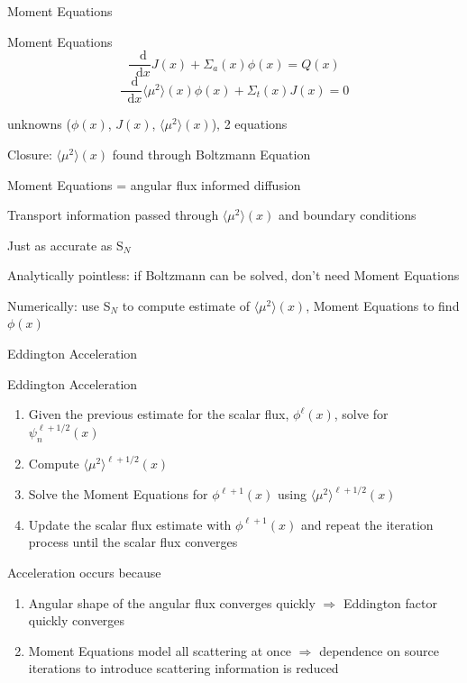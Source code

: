 \documentclass[10pt]{beamer}
\newcommand{\SN}{S$_N$\xspace}
\newcommand{\ud}{\mathop{}\!\mathrm{d}} %
\newcommand{\dderiv}[2]{\frac{\ud #1}{\ud #2}}
\newcommand{\edd}{\langle \mu^2 \rangle}
\begin{document}
\begin{frame}{Moment Equations}

	\begin{block}{Moment Equations}
	\begin{equation*}
		\dderiv{}{x} J(x) + \Sigma_a(x) \phi(x) = Q(x) \tag{\footnotesize Zeroth Moment}
	\end{equation*}
	\begin{equation*}
		\dderiv{}{x} \edd(x) \phi(x) 
		+ \Sigma_t(x) J(x) = 0 
		\tag{\footnotesize First Moment}
	\end{equation*}
	\end{block}

	 unknowns ($\phi(x)$, $J(x)$, $\edd(x)$), 2 equations 

	\pause 
	Closure: $\edd(x)$ found through Boltzmann Equation  

	\pause
	Moment Equations = angular flux informed diffusion

	\pause
	Transport information passed through $\edd(x)$ and boundary conditions

	\pause
	Just as accurate as \SN

	\pause 
	Analytically pointless: if Boltzmann can be solved, don't need Moment Equations 

	\pause 
	Numerically: use \SN to compute estimate of $\edd(x)$, Moment Equations to find $\phi(x)$

\end{frame}

\begin{frame}{Eddington Acceleration}

	\begin{exampleblock}{Eddington Acceleration}
	\begin{enumerate}
		\item Given the previous estimate for the scalar flux, $\phi^{\ell}(x)$, solve for $\psi_n^{\ell+1/2}(x)$

		\item \alert{Compute $\edd^{\ell+1/2}(x)$ }

		\item \alert{Solve the Moment Equations for $\phi^{\ell+1}(x)$ 
			using $\edd^{\ell+1/2}(x)$} 

		\item Update the scalar flux estimate with $\phi^{\ell+1}(x)$ and repeat the iteration process until the scalar flux converges
	\end{enumerate}
	\end{exampleblock}

	\pause
	Acceleration occurs because
	\begin{enumerate}
		\item Angular shape of the angular flux converges quickly $\Rightarrow$ Eddington factor quickly converges 

		\item Moment Equations model all scattering at once $\Rightarrow$ dependence on source iterations to introduce scattering information is reduced 

	\end{enumerate}

\end{frame}
\end{document}
